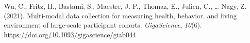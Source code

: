 \documentclass[
  english,
  man,floatsintext]{apa6}
\newlength{\cslhangindent}
\newenvironment{CSLReferences}[2] %
 {%
  \setlength{\parindent}{0pt}
  \ifodd #1 \everypar{\setlength{\hangindent}{\cslhangindent}}\ignorespaces\fi
  \ifnum #2 > 0
  \setlength{\parskip}{#2\baselineskip}
  \fi
 }%
 {}
\begin{document}
\begin{CSLReferences}{1}{0}
\leavevmode{}%
Wu, C., Fritz, H., Bastami, S., Maestre, J. P., Thomaz, E., Julien, C., \ldots{} Nagy, Z. (2021). Multi-modal data collection for measuring health, behavior, and living environment of large-scale participant cohorts. \emph{GigaScience}, \emph{10}(6). \url{https://doi.org/10.1093/gigascience/giab044}

\end{CSLReferences}
\end{document}
